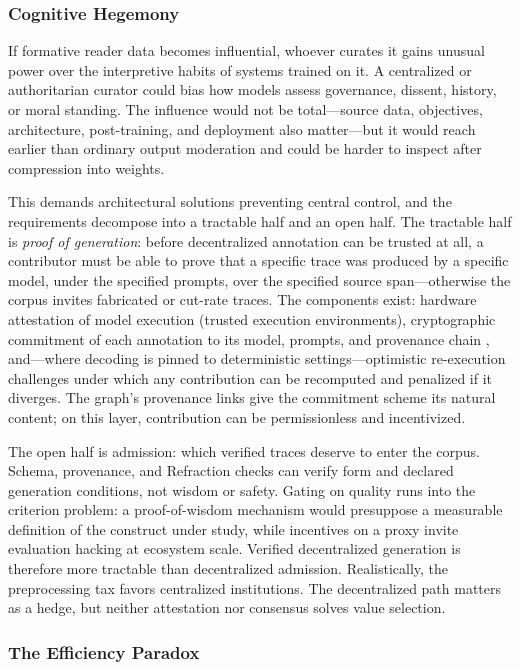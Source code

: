 \subsubsection{Cognitive Hegemony}

If formative reader data becomes influential, whoever curates it gains unusual
power over the interpretive habits of systems trained on it. A centralized or
authoritarian curator could bias how models assess governance, dissent, history,
or moral standing. The influence would not be total---source data, objectives,
architecture, post-training, and deployment also matter---but it would reach
earlier than ordinary output moderation and could be harder to inspect after
compression into weights.

This demands architectural solutions preventing central control, and the requirements decompose into a tractable half and an open half. The tractable half is \emph{proof of generation}: before decentralized annotation can be trusted at all, a contributor must be able to prove that a specific trace was produced by a specific model, under the specified prompts, over the specified source span---otherwise the corpus invites fabricated or cut-rate traces. The components exist: hardware attestation of model execution (trusted execution environments), cryptographic commitment of each annotation to its model, prompts, and provenance chain \cite{arutyunyan2023decentralized, harris2019decentralized}, and---where decoding is pinned to deterministic settings---optimistic re-execution challenges under which any contribution can be recomputed and penalized if it diverges. The graph's provenance links give the commitment scheme its natural content; on this layer, contribution can be permissionless and incentivized.

The open half is admission: which verified traces deserve to enter the corpus.
Schema, provenance, and Refraction checks can verify form and declared
generation conditions, not wisdom or safety. Gating on quality runs into the
criterion problem: a proof-of-wisdom mechanism would presuppose a measurable
definition of the construct under study, while incentives on a proxy invite
evaluation hacking at ecosystem scale. Verified decentralized generation is
therefore more tractable than decentralized admission. Realistically, the
preprocessing tax favors centralized institutions. The decentralized path
matters as a hedge, but neither attestation nor consensus solves value selection.

\subsubsection{The Efficiency Paradox}

